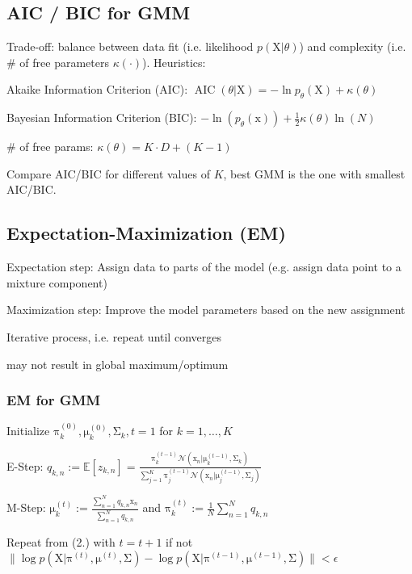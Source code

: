 \documentclass[a4paper, 11pt, landscape]{article}
\newcommand{\matr}[1]{\boldsymbol{\mathrm{#1}}}
\begin{document}
\begin{multicols*}{3}
\subsection{AIC / BIC for GMM}
Trade-off: balance between data fit (i.e. likelihood $p(\matr{X} | \theta)$) and complexity (i.e. \# of free parameters $\kappa(\cdot)$). Heuristics:
\begin{compactdesc}
	\item[Akaike Information Criterion (AIC):] $\operatorname{AIC}(\theta | \matr{X}) = -\ln p_\theta(\matr{X}) + \kappa(\theta)$
	\item[Bayesian Information Criterion (BIC):] $-\ln(p_\theta(\matr{x})) + \frac{1}{2} \kappa(\theta) \ln(N)$
	\item[\# of free params:] $\kappa(\theta) = K \cdot D + (K-1)$
\end{compactdesc}
Compare AIC/BIC for different values of $K$, best GMM is the one with smallest AIC/BIC.


\subsection{Expectation-Maximization (EM)}
\begin{compactitem}
	\item Expectation step: Assign data to parts of the model (e.g. assign data point to a mixture component)
	\item Maximization step: Improve the model parameters based on the new assignment
	\item Iterative process, i.e. repeat until converges
	\item may not result in global maximum/optimum
\end{compactitem}

\subsubsection{EM for GMM}
\begin{compactenum}
	\item Initialize $\matr{\pi}_k^{(0)}, \matr{\mu}_k^{(0)}, \matr{\Sigma}_k, t = 1$ for $k = 1, \ldots, K$
	\item E-Step: $q_{k,n} := \mathbb{E}[z_{k,n}] = \frac{\matr{\pi}_k^{(t-1)} \mathcal{N}(\matr{x}_n | \matr{\mu}_k^{(t-1)}, \matr{\Sigma}_k)}{\sum_{j=1}^K \matr{\pi}_j^{(t-1)} \mathcal{N}(\matr{x}_n | \matr{\mu}_j^{(t-1)}, \matr{\Sigma}_j)}$
	\item M-Step: $\matr{\mu}_k^{(t)} := \frac{\sum_{n=1}^N q_{k,n} \matr{x}_n}{\sum_{n=1}^N q_{k,n}}$ and $\matr{\pi}_k^{(t)} := \frac{1}{N} \sum_{n=1}^N q_{k,n}$
	\item Repeat from (2.) with $t = t + 1$ if not $\| \log p(\matr{X} | \matr{\pi}^{(t)}, \matr{\mu}^{(t)}, \matr{\Sigma}) - \log p(\matr{X} | \matr{\pi}^{(t-1)}, \matr{\mu}^{(t-1)}, \matr{\Sigma}) \| < \epsilon$
\end{compactenum}



\end{multicols*}
\end{document}
